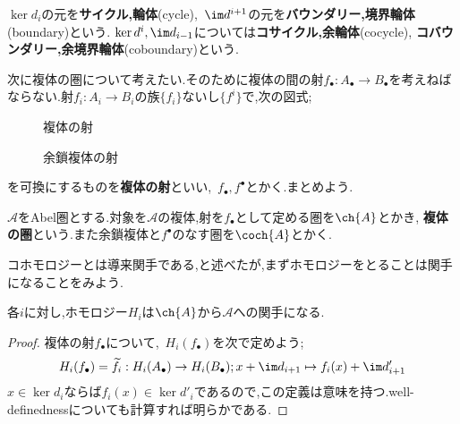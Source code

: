 \begin{defi}
	$\ker d_i$の元を\textbf{サイクル,輪体}(cycle),~$\im d^{i+1}$の元を\textbf{バウンダリー,境界輪体}(boundary)という. $\ker d^i,\im d_{i-1}$については\textbf{コサイクル,余輪体}(cocycle), \textbf{コバウンダリー,余境界輪体}(coboundary)という.
\end{defi}

次に複体の圏について考えたい.そのために複体の間の射$f_\bullet:A_\bullet\to B_\bullet$を考えねばならない.射$f_i:A_i\to B_i$の族$\{f_i\}$ないし$\{f^i\}$で,次の図式;

\begin{minipage}{.45\textwidth}
	\begin{figure}[H]
		\centering
		\caption{複体の射}\label{fig:複体の射}
	\end{figure}
\end{minipage}
\hfill
\begin{minipage}{.45\textwidth}
\begin{figure}[H]
	\centering
	\caption{余鎖複体の射}\label{fig:余鎖複体の射}
\end{figure}
\end{minipage}

を可換にするものを\textbf{複体の射}といい,~$f_\bullet,f^\bullet$とかく.まとめよう.
\begin{defi}[複体の圏]
	$\mathscr{A}$をAbel圏とする.対象を$\mathscr{A}$の複体,射を$f_\bullet$として定める圏を$\ch{A}$とかき, \textbf{複体の圏}という.また余鎖複体と$f^\bullet$のなす圏を$\coch{A}$とかく.
\end{defi}\let\co\coch
コホモロジーとは導来関手である,と述べたが,まずホモロジーをとることは関手になることをみよう.
\begin{prop}
	各$i$に対し,ホモロジー$H_i$は$\ch{A}$から$\mathscr{A}$への関手になる.
\end{prop}
\begin{proof}
	複体の射$f_\bullet$について,~$H_i(f_\bullet)$を次で定めよう;
	\[H_i(f_\bullet)=\widetilde{f}_i:H_i(A_\bullet)\to H_i(B_\bullet);x+\im d_{i+1}\mapsto f_i(x)+\im d_{i+1}'\]
	$x\in\ker d_i$ならば$f_i(x)\in\ker d'_i$であるので,この定義は意味を持つ.well-definednessについても計算すれば明らかである.
\end{proof}

